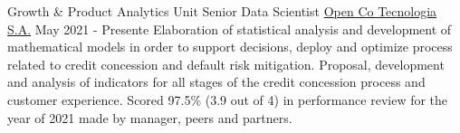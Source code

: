 


\begin{cventries}
\cventry
{Growth \& Product Analytics Unit} %
{Senior Data Scientist} %
{\href{https://www.open-co.com/en}{Open Co Tecnologia S.A.}} %
{May 2021 - Presente} %
{ %
Elaboration of statistical analysis and development of mathematical models in order to support decisions, deploy and optimize process related to credit concession and default risk mitigation.\newline
Proposal, development and analysis of indicators for all stages of the credit concession process and customer experience.\newline
Scored 97.5\% (3.9 out of 4) in performance review for the year of 2021 made by manager, peers and partners.
\newline
}



\end{cventries}
